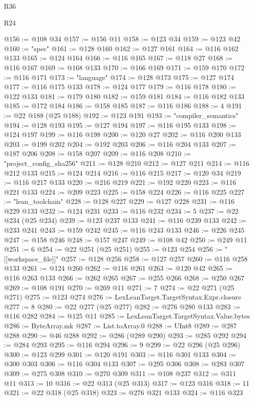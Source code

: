 \begin{lexlean}{R36}
\begin{lexlean}{R24}
\begin{coremodule}
{{{{{{{{{{{{{{{{{{{{{{{{{{{{{{{{{{{{{{{{{{{{{{{{{{{{{{{{{{{{{{{{{{{{{{{{{{{{{{{{{{{{{{{{{{{{{{{{{{{{{{{{{{{{{{{{{{{{{{{{{{{{{{{{{{{{{{{{{{{{{{{{{{{{{{{{{{{{{{{{{{{{{{{{{{{{{{{{{{{{{{{{{{{{{{{{{{{@156 := @108 @34
@157 := @156 @11
@158 := @123 @34
@159 := @123 @42
@160 := "spec"
@161 := @128 @160
@162 := @127 @161
@164 := @116 @162 @133
@165 := @124 @164
@166 := @116 @165
@167 := @118 @27
@168 := @116 @167
@169 := @168 @133
@170 := @166 @169
@171 := @159 @170
@172 := @116 @171
@173 := "language"
@174 := @128 @173
@175 := @127 @174
@177 := @116 @175 @133
@178 := @124 @177
@179 := @116 @178
@180 := @122 @133
@181 := @179 @180
@182 := @159 @181
@184 := @116 @182 @133
@185 := @172 @184
@186 := @158 @185
@187 := @116 @186
@188 := 4
@191 := @22 @188 (@25 @188)
@192 := @123 @191
@193 := "compiler_semantics"
@194 := @128 @193
@195 := @127 @194
@197 := @116 @195 @133
@198 := @124 @197
@199 := @116 @198
@200 := @120 @27
@202 := @116 @200 @133
@203 := @199 @202
@204 := @192 @203
@206 := @116 @204 @133
@207 := @187 @206
@208 := @158 @207
@209 := @116 @208
@210 := "project_config_sha256"
@211 := @128 @210
@212 := @127 @211
@214 := @116 @212 @133
@215 := @124 @214
@216 := @116 @215
@217 := @120 @34
@219 := @116 @217 @133
@220 := @216 @219
@221 := @192 @220
@223 := @116 @221 @133
@224 := @209 @223
@225 := @158 @224
@226 := @116 @225
@227 := "lean_toolchain"
@228 := @128 @227
@229 := @127 @228
@231 := @116 @229 @133
@232 := @124 @231
@233 := @116 @232
@234 := 5
@237 := @22 @234 (@25 @234)
@239 := @123 @237 @133
@241 := @116 @239 @133
@242 := @233 @241
@243 := @159 @242
@245 := @116 @243 @133
@246 := @226 @245
@247 := @158 @246
@248 := @157 @247
@249 := @108 @42
@250 := @249 @11
@251 := 6
@254 := @22 @251 (@25 @251)
@255 := @123 @254
@256 := "[[workspace_file]]"
@257 := @128 @256
@258 := @127 @257
@260 := @116 @258 @133
@261 := @124 @260
@262 := @116 @261
@263 := @120 @42
@265 := @116 @263 @133
@266 := @262 @265
@267 := @255 @266
@268 := @250 @267
@269 := @108 @191
@270 := @269 @11
@271 := 7
@274 := @22 @271 (@25 @271)
@275 := @123 @274
@276 := LexLeanTarget.TargetSyntax.Expr.closure
@277 := 8
@280 := @22 @277 (@25 @277)
@282 := @276 @280 @133
@283 := @116 @282
@284 := @125 @11
@285 := LexLeanTarget.TargetSyntax.Value.bytes
@286 := ByteArray.mk
@287 := List.toArray.{0}
@288 := UInt8
@289 := @287 @288
@290 := @46 @288
@292 := @286 (@289 @290)
@293 := @285 @292
@294 := @284 @293
@295 := @116 @294
@296 := 9
@299 := @22 @296 (@25 @296)
@300 := @123 @299
@301 := @120 @191
@303 := @116 @301 @133
@304 := @300 @303
@306 := @116 @304 @133
@307 := @295 @306
@308 := @283 @307
@309 := @275 @308
@310 := @270 @309
@311 := @108 @237
@312 := @311 @11
@313 := 10
@316 := @22 @313 (@25 @313)
@317 := @123 @316
@318 := 11
@321 := @22 @318 (@25 @318)
@323 := @276 @321 @133
@324 := @116 @323
}}}}}}}}}}}}}}}}}}}}}}}}}}}}}}}}}}}}}}}}}}}}}}}}}}}}}}}}}}}}}}}}}}}}}}}}}}}}}}}}}}}}}}}}}}}}}}}}}}}}}}}}}}}}}}}}}}}}}}}}}}}}}}}}}}}}}}}}}}}}}}}}}}}}}}}}}}}}}}}}}}}}}}}}}}}}}}}}}}}}}}}}}}}}}}}}}}}
\end{coremodule}
\end{lexlean}
\end{lexlean}
